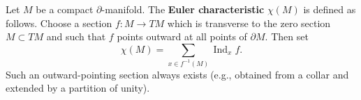 Let $M$ be a compact $\partial$-manifold. The \textbf{Euler characteristic} $\chi(M)$ is defined as follows. Choose a section $f \colon M \to TM$ which is transverse to the zero section $M \subset TM$ and such that $f$ points outward at all points of $\partial M$. Then set
$$
\chi(M) = \sum_{x \in f^{-1}(M)} \operatorname{Ind}_{x} f.
$$
Such an outward-pointing section always exists (e.g., obtained from a collar and extended by a partition of unity).

